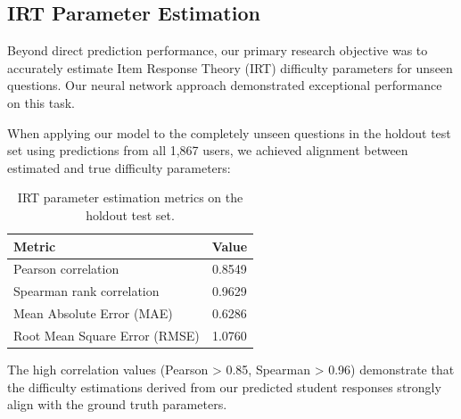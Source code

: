 \documentclass[
    a4paper, %
    10pt, %
    twoside, %
]{LTJournalArticle}
\begin{document}
\subsection{IRT Parameter Estimation}

Beyond direct prediction performance, our primary research objective was to accurately estimate Item Response Theory (IRT) difficulty parameters for unseen questions. Our neural network approach demonstrated exceptional performance on this task.

When applying our model to the completely unseen questions in the holdout test set using predictions from all 1,867 users, we achieved alignment between estimated and true difficulty parameters:

\begin{table}[H]
    \centering
    \begin{tabular}{lc}
        \hline
        \textbf{Metric} & \textbf{Value} \\
        \hline
        Pearson correlation & 0.8549 \\
        Spearman rank correlation & 0.9629 \\
        Mean Absolute Error (MAE) & 0.6286 \\
        Root Mean Square Error (RMSE) & 1.0760 \\
        \hline
    \end{tabular}
    \caption{IRT parameter estimation metrics on the holdout test set.}
    \label{tab:irt-metrics}
\end{table}

The high correlation values (Pearson > 0.85, Spearman > 0.96) demonstrate that the difficulty estimations derived from our predicted student responses strongly align with the ground truth parameters.
\end{document}
